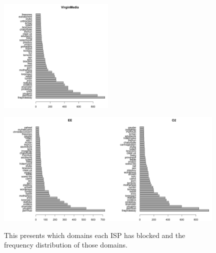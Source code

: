 \documentclass{bmcart}
\begin{document}
\begin{figure}[h!]
\includegraphics[width=0.49\textwidth]{imgs/VirginMedia-blocked-pages-to-date}
\label{fig:broadband-blocked-domains}
\end{figure}


\begin{figure}[h!]
\caption{ This presents which domains each ISP has blocked and the frequency distribution of those domains.}
\includegraphics[width=0.49\textwidth]{imgs/EE-blocked-pages-to-date}\includegraphics[width=0.49\textwidth]{imgs/O2-blocked-pages-to-date}

\end{figure}
\end{document}

